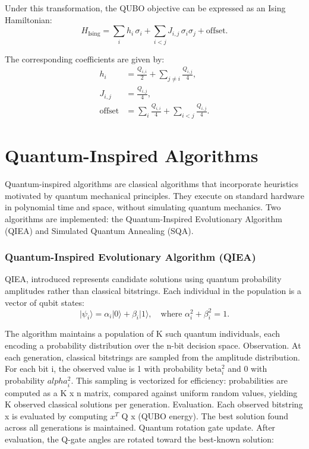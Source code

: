 Under this transformation, the QUBO objective can be expressed as an Ising Hamiltonian:
\begin{equation}
H_{\text{Ising}} = \sum_{i} h_i \, \sigma_i + \sum_{i<j} J_{i,j} \, \sigma_i \sigma_j + \text{offset}.
\end{equation}

The corresponding coefficients are given by:
\begin{align}
h_i &= \frac{Q_{i,i}}{2} + \sum_{j \neq i} \frac{Q_{i,j}}{4}, \\
J_{i,j} &= \frac{Q_{i,j}}{4}, \\
\text{offset} &= \sum_{i} \frac{Q_{i,i}}{4} + \sum_{i<j} \frac{Q_{i,j}}{4}.
\end{align}

\section{Quantum-Inspired Algorithms}
Quantum-inspired algorithms are classical algorithms that incorporate heuristics motivated by quantum mechanical principles. They execute on standard hardware in polynomial time and space, without simulating quantum mechanics. Two algorithms are implemented: the Quantum-Inspired Evolutionary Algorithm (QIEA) and Simulated Quantum Annealing (SQA).

\subsubsection{Quantum-Inspired Evolutionary Algorithm (QIEA)}
QIEA, introduced represents candidate solutions using quantum probability amplitudes rather than classical bitstrings. Each individual in the population is a vector of qubit states:
\begin{equation}
\lvert \psi_i \rangle = \alpha_i \lvert 0 \rangle + \beta_i \lvert 1 \rangle, 
\quad \text{where } \alpha_i^2 + \beta_i^2 = 1.
\end{equation}

The algorithm maintains a population of K such quantum individuals, each encoding a probability distribution over the n-bit decision space.
Observation. At each generation, classical bitstrings are sampled from the amplitude distribution. For each bit i, the observed value is 1 with probability beta$_i^2$ and 0 with probability $alpha_i^2$. This sampling is vectorized for efficiency: probabilities are computed as a K x n matrix, compared against uniform random values, yielding K observed classical solutions per generation.
Evaluation. Each observed bitstring x is evaluated by computing $x^T$ Q x (QUBO energy). The best solution found across all generations is maintained.
Quantum rotation gate update. After evaluation, the Q-gate angles are rotated toward the best-known solution:

